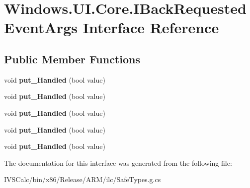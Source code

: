\hypertarget{interface_windows_1_1_u_i_1_1_core_1_1_i_back_requested_event_args}{}\section{Windows.\+U\+I.\+Core.\+I\+Back\+Requested\+Event\+Args Interface Reference}
\label{interface_windows_1_1_u_i_1_1_core_1_1_i_back_requested_event_args}
\subsection*{Public Member Functions}
\begin{DoxyCompactItemize}
\item 
\mbox{\label{interface_windows_1_1_u_i_1_1_core_1_1_i_back_requested_event_args_a96874d158ca5efb2357c733232f396fc}} 
void {\bfseries put\+\_\+\+Handled} (bool value)
\item 
\mbox{\label{interface_windows_1_1_u_i_1_1_core_1_1_i_back_requested_event_args_a96874d158ca5efb2357c733232f396fc}} 
void {\bfseries put\+\_\+\+Handled} (bool value)
\item 
\mbox{\label{interface_windows_1_1_u_i_1_1_core_1_1_i_back_requested_event_args_a96874d158ca5efb2357c733232f396fc}} 
void {\bfseries put\+\_\+\+Handled} (bool value)
\item 
\mbox{\label{interface_windows_1_1_u_i_1_1_core_1_1_i_back_requested_event_args_a96874d158ca5efb2357c733232f396fc}} 
void {\bfseries put\+\_\+\+Handled} (bool value)
\item 
\mbox{\label{interface_windows_1_1_u_i_1_1_core_1_1_i_back_requested_event_args_a96874d158ca5efb2357c733232f396fc}} 
void {\bfseries put\+\_\+\+Handled} (bool value)
\end{DoxyCompactItemize}


The documentation for this interface was generated from the following file\+:\begin{DoxyCompactItemize}
\item 
I\+V\+S\+Calc/bin/x86/\+Release/\+A\+R\+M/ilc/Safe\+Types.\+g.\+cs\end{DoxyCompactItemize}

